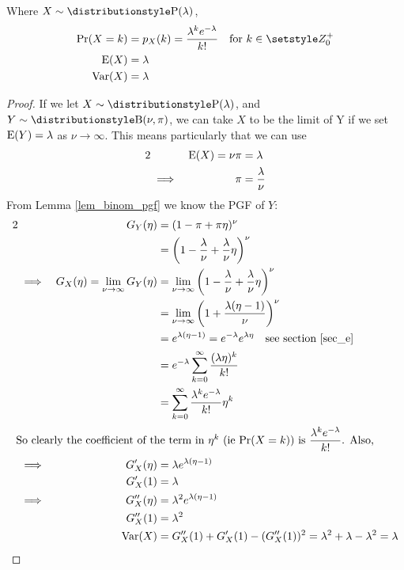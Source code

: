 \begin{theorem}
Where \(X \sim \Poisson(\lambda)\),
\begin{align*}
\Prob(X = k) &= p_X(k) = \frac{\lambda^k e^{-\lambda}}{k!}
    \quad \text{for \(k \in \Integers^+_0\)} \\
\Expect(X) &= \lambda \\
\Var(X) &= \lambda
\end{align*}
\end{theorem}
\begin{proof}
If we let \(X \sim \Poisson(\lambda)\), and \(Y \sim \Binomial(\nu, \pi)\),
we can take \(X\) to be the limit of Y if we set \(\operatorname{E}(Y) = \lambda\)
as \(\nu \to \infty\). This means particularly that we can use
\begin{alignat*}2
&& \Expect(X) = \nu \pi &= \lambda \\
&\implies& \pi &= \frac \lambda \nu
\end{alignat*}
From Lemma \ref{lem_binom_pgf} we know the PGF of \(Y\):
\begin{alignat*}2
&& G_Y(\eta) &= (1 - \pi + \pi \eta)^\nu \\
&&  &= \pqty{1 - \frac \lambda \nu + \frac \lambda \nu \eta}^\nu \\
&\implies& G_X(\eta) = \lim_{\nu \to \infty}G_Y(\eta)
    &= \lim_{\nu \to \infty} \pqty{1 - \frac \lambda \nu
                                 + \frac \lambda \nu \eta}^\nu \\
&&  &= \lim_{\nu \to \infty} \pqty{1 + \frac{\lambda(\eta - 1)}\nu}^\nu \\
&&  &= e^{\lambda(\eta - 1)} = e^{-\lambda}e^{\lambda \eta}
    \quad \text{see section \ref{sec_e}} \\
&&  &= e^{-\lambda} \sum_{k = 0}^\infty \frac{(\lambda \eta)^k}{k!} \\
&&  &= \sum_{k = 0}^\infty \frac{\lambda ^k e^{-\lambda}}{k!} \eta^k \\
\intertext{
So clearly the coefficient of the term in \(\eta^k\) (ie \(\Prob(X = k)\)) is
\(\dfrac{\lambda^k e^{-\lambda}}{k!}\). Also,}
&\implies& G_X'(\eta) &= \lambda e^{\lambda(\eta - 1)} \\
&& G_X'(1) &= \lambda \\
&\implies& G_X''(\eta) &= \lambda^2 e^{\lambda(\eta - 1)} \\
&& G_X''(1) &= \lambda^2 \\
&& \Var(X) &= G_X''(1) + G_X'(1) - (G_X''(1))^2
    = \lambda^2 + \lambda - \lambda^2 = \lambda \qedhere
\end{alignat*}
\end{proof}

